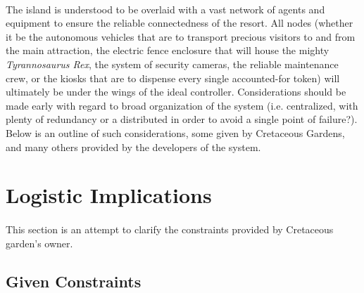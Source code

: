 \documentclass[12pt]{article}
\begin{document}
\paragraph{} The island is understood to be overlaid with a vast network of agents and equipment to
ensure the reliable connectedness of the resort. All nodes (whether it be the autonomous vehicles that are
to transport precious visitors to and from the main attraction, the electric fence enclosure that will 
house the mighty \textit{Tyrannosaurus Rex}, the system of security cameras, the reliable maintenance crew, 
or the kiosks that are to dispense every single accounted-for token) will ultimately be under the wings
of the ideal controller. Considerations should be made early with regard to broad organization of the system
(i.e. centralized, with plenty of redundancy or a distributed in order to avoid a single point of failure?).
Below is an outline of such considerations, some given by Cretaceous Gardens, and many others provided by
the developers of the system.


\section{Logistic Implications}
\paragraph{} This section is an attempt to clarify the constraints provided by Cretaceous garden's owner.

	\subsection{Given Constraints}
\end{document}
